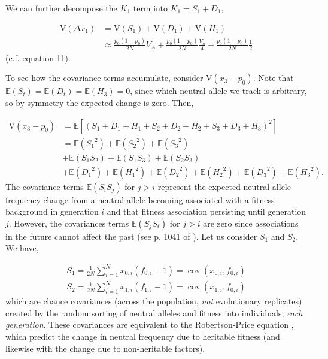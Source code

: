 \documentclass[11pt]{article}
\newcommand{\E}{\mathbb{E}}
\newcommand{\V}{\text{V}}
\DeclareMathOperator{\cov}{cov}
\begin{document}
We can further decompose the $K_1$ term into $K_1 = S_1 + D_1$,

\begin{align}
  \V(\Delta x_1) &= \V(S_1) + \V(D_1) + \V(H_1) \nonumber \\
                   &\approx \frac{p_0(1-p_0)}{2N} V_A + \frac{p_0(1-p_0)}{2N} \frac{V_n}{4} + \frac{p_0(1-p_0)}{2N} \frac{1}{2} \label{supp-eq:varterms} 
\end{align}
%
(c.f. \cite{Santiago1995-hx} equation 11).

To see how the covariance terms accumulate, consider $\V(x_3 - p_0)$. Note
that $\E(S_t) = \E(D_t) = \E(H_3) = 0$, since which neutral allele we track is
arbitrary, so by symmetry the expected change is zero. Then,

\begin{align}
  \label{eq:var_x}
  \V(x_3 - p_0) &= \E\left[ \left(S_1 + D_1 + H_1 + S_2 + D_2 + H_2 + S_3 + D_3 + H_3 \right)^2 \right] \nonumber \\
                  &= \E({S_1}^2) + \E({S_2}^2) + \E({S_3}^2) \nonumber \\
                  &+ \E(S_1 S_2) + \E(S_1 S_3) + \E(S_2 S_3)\nonumber \\
                  &+ \E({D_1}^2) + \E({H_1}^2) + \E({D_2}^2) + \E({H_2}^2) + \E({D_3}^2) + \E({H_3}^2).
\end{align}
%
The covariance terms $\E(S_i S_j)$ for $j > i$ represent the expected neutral
allele frequency change from a neutral allele becoming associated with a
fitness background in generation $i$ and that fitness association persisting
until generation $j$. However, the covariances terms $\E(S_j S_i)$ for $j > i$
are zero since associations in the future cannot affect the past (see p. 1041
of \cite{Buffalo2019-qs}). Let us consider $S_1$ and $S_2$. We have,

\begin{align}
  S_1 = \frac{1}{2N} \sum_{i=1}^N x_{0,i}(f_{0,i} - 1) = \cov(x_{0,i}, f_{0,i}) \nonumber \\
  S_2 = \frac{1}{2N} \sum_{i=1}^N x_{1,i}(f_{1,i} - 1) = \cov(x_{1,i}, f_{0,i})
\end{align}
%
which are chance covariances (across the population, \emph{not} evolutionary
replicates) created by the random sorting of neutral alleles and fitness into
individuals, \emph{each generation}. These covariances are equivalent to the
Robertson-Price equation \parencite{Robertson1966-fs,Price1970-si}, which
predict the change in neutral frequency due to heritable fitness (and likewise
with the change due to non-heritable factors).
\end{document}
